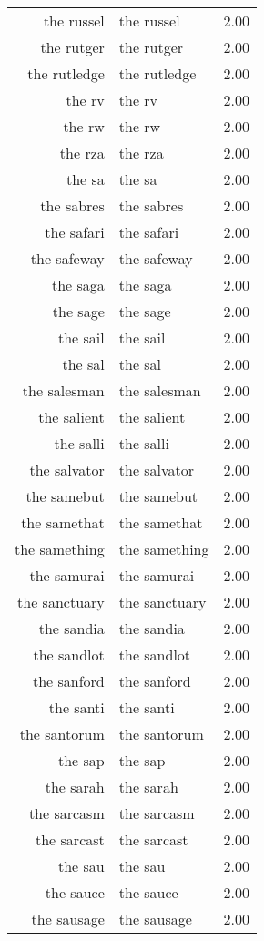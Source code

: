\begin{table}[ht]
\begin{tabular}{rlr}
  the russel & the russel & 2.00 \\ 
  the rutger & the rutger & 2.00 \\ 
  the rutledge & the rutledge & 2.00 \\ 
  the rv & the rv & 2.00 \\ 
  the rw & the rw & 2.00 \\ 
  the rza & the rza & 2.00 \\ 
  the sa & the sa & 2.00 \\ 
  the sabres & the sabres & 2.00 \\ 
  the safari & the safari & 2.00 \\ 
  the safeway & the safeway & 2.00 \\ 
  the saga & the saga & 2.00 \\ 
  the sage & the sage & 2.00 \\ 
  the sail & the sail & 2.00 \\ 
  the sal & the sal & 2.00 \\ 
  the salesman & the salesman & 2.00 \\ 
  the salient & the salient & 2.00 \\ 
  the salli & the salli & 2.00 \\ 
  the salvator & the salvator & 2.00 \\ 
  the samebut & the samebut & 2.00 \\ 
  the samethat & the samethat & 2.00 \\ 
  the samething & the samething & 2.00 \\ 
  the samurai & the samurai & 2.00 \\ 
  the sanctuary & the sanctuary & 2.00 \\ 
  the sandia & the sandia & 2.00 \\ 
  the sandlot & the sandlot & 2.00 \\ 
  the sanford & the sanford & 2.00 \\ 
  the santi & the santi & 2.00 \\ 
  the santorum & the santorum & 2.00 \\ 
  the sap & the sap & 2.00 \\ 
  the sarah & the sarah & 2.00 \\ 
  the sarcasm & the sarcasm & 2.00 \\ 
  the sarcast & the sarcast & 2.00 \\ 
  the sau & the sau & 2.00 \\ 
  the sauce & the sauce & 2.00 \\ 
  the sausage & the sausage & 2.00 \\ 

\end{tabular}
\end{table}
